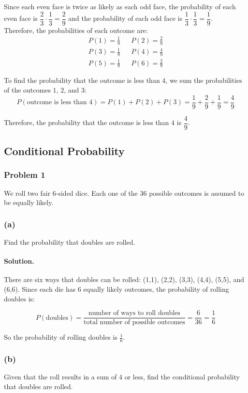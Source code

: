 Since each even face is twice as likely as each odd face, the probability of each even face is $\dfrac{2}{3}\cdot \dfrac{1}{3} = \dfrac{2}{9}$ and the probability of each odd face is $\dfrac{1}{3}\cdot \dfrac{1}{3} = \dfrac{1}{9}$.\\

Therefore, the probabilities of each outcome are:
\begin{align*}
    P(1) = \frac{1}{9} &  & P(2) = \frac{2}{9} \\
    P(3) = \frac{1}{9} &  & P(4) = \frac{4}{9} \\
    P(5) = \frac{1}{9} &  & P(6) = \frac{2}{9}
\end{align*}

To find the probability that the outcome is less than $4$, we sum the probabilities of the outcomes $1$, $2$, and $3$:
$$P(\text{outcome is less than 4}) = P(\text{1}) + P(\text{2}) + P(\text{3}) = \frac{1}{9} + \frac{2}{9} + \frac{1}{9} = \frac{4}{9}$$

Therefore, the probability that the outcome is less than $4$ is $\dfrac{4}{9}$.

\newpage
\subsection{Conditional Probability}
\subsubsection{Problem 1} We roll two fair 6-sided dice. Each one of the 36 possible outcomes is assumed to be equally likely.

\subsubsection{(a)} Find the probability that doubles are rolled.
\paragraph{Solution.} There are six ways that doubles can be rolled: (1,1), (2,2), (3,3), (4,4), (5,5), and (6,6). Since each die has 6 equally likely outcomes, the probability of rolling doubles is:

$$P(\text{doubles}) = \frac{\text{number of ways to roll doubles}}{\text{total number of possible outcomes}} = \frac{6}{36} = \frac{1}{6}$$

So the probability of rolling doubles is $\frac{1}{6}$.

\subsubsection{(b)} Given that the roll results in a sum of 4 or less, find the conditional probability that doubles are rolled.
